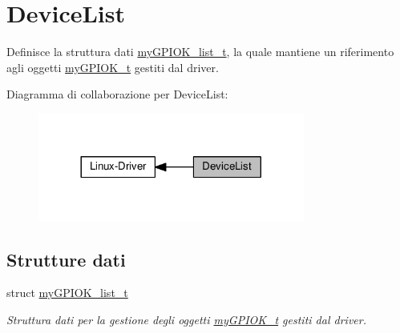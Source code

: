 \hypertarget{group___device_list}{}\section{Device\+List}
\label{group___device_list}


Definisce la struttura dati \hyperlink{structmy_g_p_i_o_k__list__t}{my\+G\+P\+I\+O\+K\+\_\+list\+\_\+t}, la quale mantiene un riferimento agli oggetti \hyperlink{structmy_g_p_i_o_k__t}{my\+G\+P\+I\+O\+K\+\_\+t} gestiti dal driver.  


Diagramma di collaborazione per Device\+List\+:\nopagebreak
\begin{figure}[H]
\begin{center}
\leavevmode
\includegraphics[width=248pt]{group___device_list}
\end{center}
\end{figure}
\subsection*{Strutture dati}
\begin{DoxyCompactItemize}
\item 
struct \hyperlink{structmy_g_p_i_o_k__list__t}{my\+G\+P\+I\+O\+K\+\_\+list\+\_\+t}
\begin{DoxyCompactList}\small\item\em Struttura dati per la gestione degli oggetti \hyperlink{structmy_g_p_i_o_k__t}{my\+G\+P\+I\+O\+K\+\_\+t} gestiti dal driver. \end{DoxyCompactList}\end{DoxyCompactItemize}
